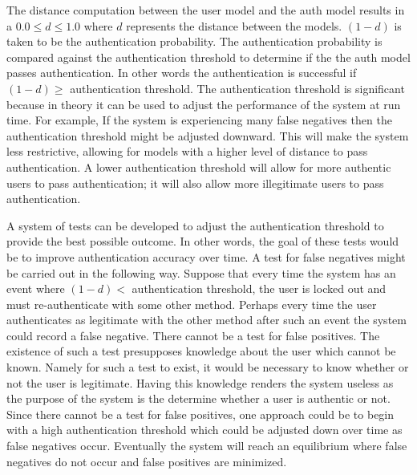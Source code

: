 
The distance computation between the 
user model and the auth model
results in a $0.0 \leq d \leq 1.0$ where
$d$ represents the distance between the models.
%
$(1 - d)$ is taken to be the authentication probability.
The authentication probability is compared against the
authentication threshold to determine if the
the auth model passes authentication.
% 
In other words the authentication is successful if
$(1 - d) \geq$ authentication threshold.
%
The authentication threshold is significant
because in theory it can be used to adjust the 
performance of the system at run time.
%
For example,
If the system is experiencing many false negatives
then the authentication threshold might be adjusted downward.
This will make the system less restrictive,
allowing for models with a higher level of distance to pass authentication.
%
A lower authentication threshold will allow for more authentic users
to pass authentication; it will also allow more illegitimate users to pass authentication.
%

A system of tests can be developed to
adjust the authentication threshold to provide the best possible outcome.
In other words,
the goal of these tests would be to improve authentication accuracy over time.
%
A test for false negatives might be carried out in the following way.
Suppose that every time the system has an event where $(1 - d) <$ authentication threshold,
the user is locked out and must re-authenticate with some other method.
Perhaps every time the user authenticates 
as legitimate
with the other method after
such an event the system could record a false negative.
%
There cannot be a test for false positives.
The existence of such a test presupposes 
knowledge about the user which cannot be known.
Namely for such a test to exist,
it would be necessary to know whether or not
the user is legitimate.
Having this knowledge renders the system useless
as the purpose of the system is the determine whether a user is authentic or not.
%
Since there cannot be a test for false positives,
one approach could be to begin with a high authentication threshold which
could be adjusted down over time as false negatives occur.
%
Eventually the system will reach an equilibrium where
false negatives do not occur and 
false positives are minimized.

